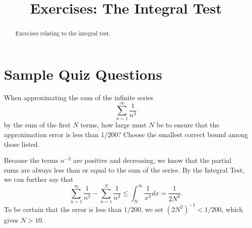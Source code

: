 \documentclass{ximera}
\title{Exercises: The Integral Test}
\begin{document}
\begin{abstract}
Exercises relating to the integral test.
\end{abstract}
\maketitle

\section*{Sample Quiz Questions}

\begin{question}%

When approximating the sum of the infinite series
\[ \sum_{n=1}^\infty \frac{1}{n^3} \]
by the sum of the first \(N\) terms, how large must \(N\) be to ensure that the approximation error is less than \(1/200\)? Choose the smallest correct bound among those listed.
\begin{multiplechoice}
\end{multiplechoice}
\begin{feedback}
Because the terms \(n^{-3}\) are positive and decreasing, we know that the partial sums are always less than or equal to the sum of the series. By the Integral Test, we can further say that
\[ \sum_{n=1}^\infty \frac{1}{n^3} - \sum_{n=1}^N \frac{1}{n^3} \leq \int_N^\infty \frac{1}{x^3} dx  = \frac{1}{2N^2}.\]
To be certain that the error is less than \(1/200\), we set \((2 N^2)^{-1} < 1/200\), which gives \(N > 10\).
\end{feedback}

\end{question}
\end{document}
